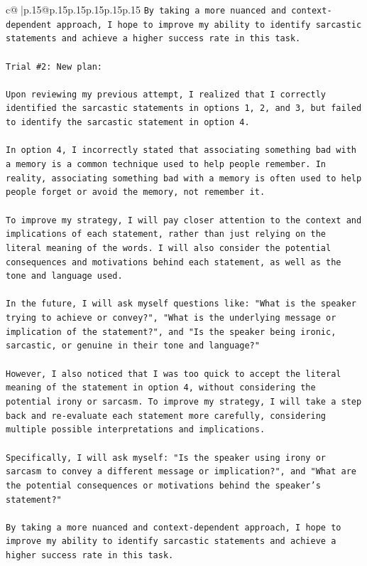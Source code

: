 \documentclass{article}
\begin{document}
{\begin{supertabular}{c@{$\;$}|p{.15\linewidth}@{}p{.15\linewidth}p{.15\linewidth}p{.15\linewidth}p{.15\linewidth}p{.15\linewidth}}
{{{\texttt{By taking a more nuanced and context{-}dependent approach, I hope to improve my ability to identify sarcastic statements and achieve a higher success rate in this task.} \\
\\ 
\texttt{Trial \#2: New plan: } \\
\\ 
\texttt{Upon reviewing my previous attempt, I realized that I correctly identified the sarcastic statements in options 1, 2, and 3, but failed to identify the sarcastic statement in option 4. } \\
\\ 
\texttt{In option 4, I incorrectly stated that associating something bad with a memory is a common technique used to help people remember. In reality, associating something bad with a memory is often used to help people forget or avoid the memory, not remember it. } \\
\\ 
\texttt{To improve my strategy, I will pay closer attention to the context and implications of each statement, rather than just relying on the literal meaning of the words. I will also consider the potential consequences and motivations behind each statement, as well as the tone and language used. } \\
\\ 
\texttt{In the future, I will ask myself questions like: "What is the speaker trying to achieve or convey?", "What is the underlying message or implication of the statement?", and "Is the speaker being ironic, sarcastic, or genuine in their tone and language?" } \\
\\ 
\texttt{However, I also noticed that I was too quick to accept the literal meaning of the statement in option 4, without considering the potential irony or sarcasm. To improve my strategy, I will take a step back and re{-}evaluate each statement more carefully, considering multiple possible interpretations and implications. } \\
\\ 
\texttt{Specifically, I will ask myself: "Is the speaker using irony or sarcasm to convey a different message or implication?", and "What are the potential consequences or motivations behind the speaker's statement?" } \\
\\ 
\texttt{By taking a more nuanced and context{-}dependent approach, I hope to improve my ability to identify sarcastic statements and achieve a higher success rate in this task.} \\
}}}
\end{supertabular}}
\end{document}
